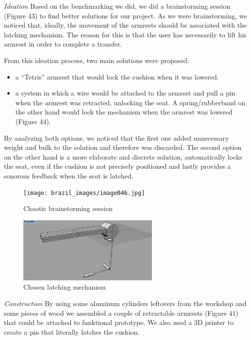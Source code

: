 \emph{Ideation}
Based on the benchmarking we did, we did a brainstorming session (Figure 43) to find better solutions for our project. As we were brainstorming, we noticed that, ideally, the movement of the armrests should be associated with the latching mechanism. The reason for this is that the user has necessarily to lift his armrest in order to complete a transfer. 

From this ideation process, two main solutions were proposed:

\begin{itemize}
	\item a “Tetris” armrest that would lock the cushion when it was lowered. 
	\item a system in which a wire would be attached to the armrest and pull a pin when the armrest was retracted, unlocking the seat. A spring/rubberband on the other hand would lock the mechanism when the armrest was lowered (Figure 44).
\end{itemize}

By analyzing both options, we noticed that the first one added unnecessary weight and bulk to the solution and therefore was discarded. The second option on the other hand is a more elaborate and discrete solution, automatically locks the seat, even if the cushion is not precisely positioned and lastly provides a sonorous feedback when the seat is latched. \\

\begin{figure}[h]
\centering
\texttt{[image: brazil\_images/image046.jpg]}
\caption{Chaotic brainstorming session}
\label{fig:chaotic_brainstorming}
\end{figure}


\begin{figure}[h]
\centering
\includegraphics[width=7cm]{brazil_images/image048.png}
\caption{Chosen latching mechanism}
\label{fig:latching}
\end{figure}


\emph{Construction}
By using some aluminum cylinders leftovers from the workshop and some pieces of wood we assembled a couple of retractable armrests (Figure 41) that could be attached to funktional prototype. We also used a 3D printer to create a pin that literally latches the cushion.

